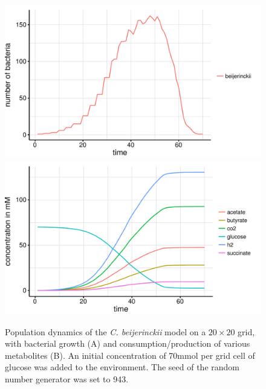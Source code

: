 \begin{figure}[h!]
  \centering
    \includegraphics[scale=0.45]{../results/beijerinckii_20x20_seed943_growth.pdf}
    \includegraphics[scale=0.45]{../results/beijerinckii_20x20_seed943_subs.pdf}
  \caption{Population dynamics of the \emph{C. beijerinckii} model on a $20\times20$ grid, with bacterial growth (A) and consumption/production of various metabolites (B). An initial concentration of 70\;mmol per grid cell of glucose was added to the environment. The seed of the random number generator was set to 943.}
  \label{fig:beijersg}
\end{figure}
